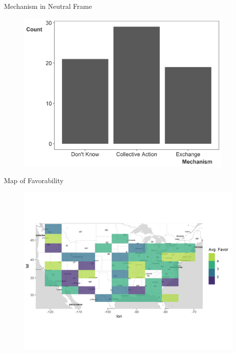 \documentclass[12pt]{beamer}
\begin{document}
\begin{frame}{Mechanism in Neutral Frame}

\begin{figure}[htbp]
	\centering
		\includegraphics[width=0.95\textwidth]{neutral-mech.png}
\end{figure}


\end{frame}



\begin{frame}{Map of Favorability}

\begin{figure}[htbp]
\centering
   \includegraphics[width=.95\textwidth]{favor-map.png}
\end{figure}

\end{frame}
\end{document}
